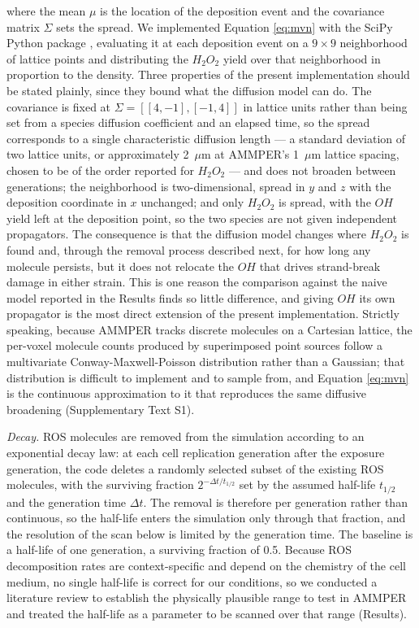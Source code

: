 \documentclass{asmarticle}
\begin{document}
where the mean $\mu$ is the location of the deposition event and the covariance matrix $\Sigma$ sets the spread. We implemented Equation \ref{eq:mvn} with the SciPy Python package \cite{virtanen2020scipy}, evaluating it at each deposition event on a $9 \times 9$ neighborhood of lattice points and distributing the $H_2O_2$ yield over that neighborhood in proportion to the density. Three properties of the present implementation should be stated plainly, since they bound what the diffusion model can do. The covariance is fixed at $\Sigma = [[4, -1], [-1, 4]]$ in lattice units rather than being set from a species diffusion coefficient and an elapsed time, so the spread corresponds to a single characteristic diffusion length --- a standard deviation of two lattice units, or approximately 2~$\mu$m at AMMPER's 1~$\mu$m lattice spacing, chosen to be of the order reported for $H_2O_2$ --- and does not broaden between generations; the neighborhood is two-dimensional, spread in $y$ and $z$ with the deposition coordinate in $x$ unchanged; and only $H_2O_2$ is spread, with the $OH$ yield left at the deposition point, so the two species are not given independent propagators. The consequence is that the diffusion model changes where $H_2O_2$ is found and, through the removal process described next, for how long any molecule persists, but it does not relocate the $OH$ that drives strand-break damage in either strain. This is one reason the comparison against the naive model reported in the Results finds so little difference, and giving $OH$ its own propagator is the most direct extension of the present implementation. Strictly speaking, because AMMPER tracks discrete molecules on a Cartesian lattice, the per-voxel molecule counts produced by superimposed point sources follow a multivariate Conway-Maxwell-Poisson distribution rather than a Gaussian; that distribution is difficult to implement and to sample from, and Equation \ref{eq:mvn} is the continuous approximation to it that reproduces the same diffusive broadening (Supplementary Text S1).

\textit{Decay.} ROS molecules are removed from the simulation according to an exponential decay law: at each cell replication generation after the exposure generation, the code deletes a randomly selected subset of the existing ROS molecules, with the surviving fraction $2^{-\Delta t / t_{1/2}}$ set by the assumed half-life $t_{1/2}$ and the generation time $\Delta t$. The removal is therefore per generation rather than continuous, so the half-life enters the simulation only through that fraction, and the resolution of the scan below is limited by the generation time. The baseline is a half-life of one generation, a surviving fraction of 0.5. Because ROS decomposition rates are context-specific and depend on the chemistry of the cell medium, no single half-life is correct for our conditions, so we conducted a literature review to establish the physically plausible range to test in AMMPER \cite{petasne1997hydrogen, yazici2010factors, wagner2013assay, guarino2019reaction, nakamura2003micromolar} and treated the half-life as a parameter to be scanned over that range (Results).
\end{document}
